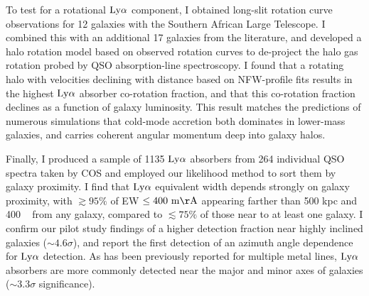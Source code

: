 To test for a rotational $\rm Ly\alpha$ component, I obtained long-slit rotation curve observations for 12 galaxies with the Southern African Large Telescope. I combined this with an additional 17 galaxies from the literature, and developed a halo rotation model based on observed rotation curves to de-project the halo gas rotation probed by QSO absorption-line spectroscopy. I found that a rotating halo with velocities declining with distance based on NFW-profile fits results in the highest $\rm Ly\alpha$ absorber co-rotation fraction, and that this co-rotation fraction declines as a function of galaxy luminosity. This result matches the predictions of numerous simulations that cold-mode accretion both dominates in lower-mass galaxies, and carries coherent angular momentum deep into galaxy halos.

Finally, I produced a sample of 1135 $\rm Ly\alpha$ absorbers from 264 individual QSO spectra taken by COS and employed our likelihood method to sort them by galaxy proximity. I find that $\rm Ly\alpha$ equivalent width depends strongly on galaxy proximity, with $\gtrsim 95\%$ of EW $\rm \leq 400~ m\AA$ appearing farther than 500 kpc and 400 \kms~ from any galaxy, compared to $\lesssim75\%$ of those near to at least one galaxy. I confirm our pilot study findings of a higher detection fraction near highly inclined galaxies ($\sim4.6 \sigma$), and report the first detection of an azimuth angle dependence for $\rm Ly\alpha$ detection. As has been previously reported for multiple metal lines, $\rm Ly\alpha$ absorbers are more commonly detected near the major and minor axes of galaxies ($\sim 3.3\sigma$ significance). 



